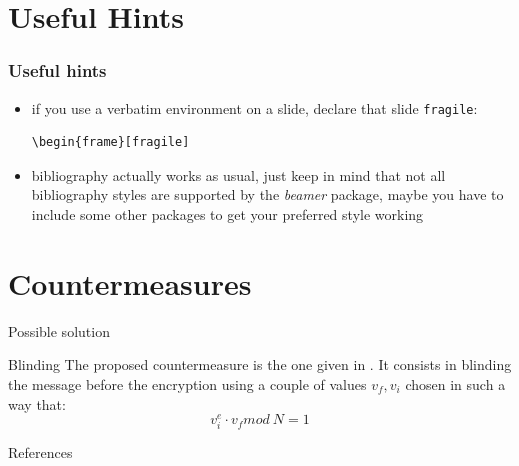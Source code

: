 \documentclass{beamer}
\begin{document}
\section{Useful Hints}

\begin{frame}[fragile]
\frametitle{Useful hints}
\begin{itemize}
\item if you use a verbatim environment on a slide, declare that slide {\tt fragile}:
\begin{verbatim}
\begin{frame}[fragile]
\end{verbatim}
\item bibliography actually works as usual, just keep in mind that not all bibliography styles are supported by the {\it beamer}
      package, maybe you have to include some other packages to get your preferred style working  
\end{itemize}
\end{frame}

\nocite{*}

\section{Countermeasures}
\begin{frame}{Possible solution}
    \begin{block}{Blinding}
		The proposed countermeasure is the one given in \cite{kocher1996timing}.
		It consists in blinding the message before the encryption using a couple of values $v_f, v_i$ chosen in such a way that:
		\begin{equation*}
			v_i^e \cdot v_f mod\: N = 1
		\end{equation*}
    \end{block}
\end{frame}

\begin{frame}[allowframebreaks]
\Large{References} \\[0.5cm]
\footnotesize


\end{frame} 
\end{document}
